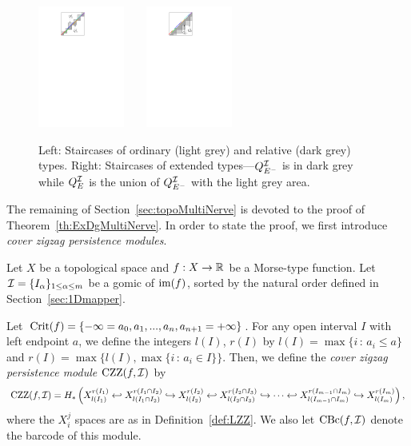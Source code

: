 \begin{figure}[h]\centering
\includegraphics[height = 4cm]{figures/StaircaseOrdRel}\ \ \ \ \includegraphics[height = 4cm]{figures/StaircaseExt}
\caption{Left: Staircases of ordinary (light grey) 
and relative (dark grey) types.
Right: Staircases of extended types---$Q_{E^-}^{\mathcal{I}}$ is in dark grey while $Q_{E}^{\mathcal{I}}$ 
is the union of $Q_{E^-}^{\mathcal{I}}$ with the light grey area.}
\label{fig:staircase}
\end{figure}

The remaining of Section~\ref{sec:topoMultiNerve} is devoted to the proof of Theorem~\ref{th:ExDgMultiNerve}.
In order to state the proof, we first introduce {\em cover zigzag persistence modules}. 

\begin{defin}\label{def:coverZZ}
Let $X$ be a topological space and $f:X\rightarrow\mathbb{R}$ be a Morse-type function.
Let $\mathcal{I}=\{I_\alpha\}_{1\leq\alpha\leq m}$ be a gomic of $\mathrm{im}(f)$, sorted by the natural order defined in Section~\ref{sec:1Dmapper}. 

Let $\mathrm{Crit}(f)=\{-\infty=a_0,a_1,...,a_n,a_{n+1}=+\infty\}$. 
For any open interval $I$ with left endpoint $a$, 
we define the integers $l(I)$, $r(I)$ by $l(I)=\max\{i\,:\,a_i\leq a\}$
and $r(I)=\max\{l(I),\max\{i\,:\,a_i\in I\}\}$.
Then, we define the {\em cover zigzag persistence module} $\mathrm{CZZ}(f,\mathcal{I})$ by 
$$\mathrm{CZZ}(f,\mathcal{I})=H_*\left(X_{l(I_1)}^{r(I_1)}\hookleftarrow X_{l(I_1\cap I_2)}^{r(I_1\cap I_2)}\hookrightarrow X_{l(I_2)}^{r(I_2)}\hookleftarrow X_{l(I_2\cap I_3)}^{r(I_2\cap I_3)}
\hookrightarrow \cdots \hookleftarrow X_{l(I_{m-1}\cap I_m)}^{r(I_{m-1}\cap I_m)}\hookrightarrow X_{l(I_m)}^{r(I_m)}\right),$$
where the $X_i^j$ spaces are as in Definition~\ref{def:LZZ}.
We also let $\mathrm{CBc}(f,\mathcal{I})$ denote the barcode of this module.
\end{defin}


